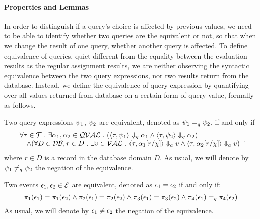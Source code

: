 \paragraph*{Properties and Lemmas}

In order to distinguish if a query's choice is affected by previous values, 
we need to be able to identify whether two queries are the equivalent or not, so that when we change the result of one query, 
whether another query is affected. 
To define equivalence of queries,
quiet different from the equality between the evaluation results as the regular assignment results, 
we are neither observing the syntactic equivalence between the two query expressions,
nor two results return from the database. 
Instead, we define the equivalence of query expression by quantifying over all values returned from database on a certain form of query value, formally as follows.

\begin{defn}
%
\label{def:query_equal}
Two query expressions $\psi_1$, $\psi_2$ are equivalent, denoted as $\psi_1 =_{q} \psi_2$, if and only if
$$
 \begin{array}{l} 
   \forall \mathtt{\tau} \in \mathcal{T} ~.~ \exists \alpha_1, \alpha_2 \in \mathcal{QVAL} ~.~
    (\langle \mathtt{\tau},  \psi_1 \rangle \Downarrow_q \alpha_1 \land \langle \mathtt{\tau},  \psi_2  \rangle \Downarrow_q \alpha_2) 
    \\
    \quad \land (\forall D \in \mathcal{DB}, r \in D ~.~ 
    \exists v \in \mathcal{VAL} ~.~ 
          \langle \mathtt{\tau}, \alpha_1[r/\chi] \rangle \Downarrow_a v \land \langle \mathtt{\tau},  \alpha_2[r/\chi]  \rangle \Downarrow_a v)  
  \end{array}.
$$
 where $r \in D$ is a record in the database domain $D$. 
 As usual, we will denote by $\psi_1 \neq_{q} \psi_2$  the negation of the equivalence.
\end{defn}
%
\begin{defn}
  Two events $\mathtt{\epsilon}_1, \mathtt{\epsilon}_2 \in \mathcal{E}$ are equivalent, 
  denoted as $\mathtt{\epsilon}_1 = \mathtt{\epsilon}_2$ 
  if and only if:
  \[
  \pi_1(\mathtt{\epsilon}_1) = \pi_1(\mathtt{\epsilon}_2) 
  \land  
  \pi_2(\mathtt{\epsilon}_1) = \pi_2(\mathtt{\epsilon}_2) 
  \land
  \pi_{3}(\mathtt{\epsilon}_1) = \pi_{3}(\mathtt{\epsilon}_2)
  \land 
  \pi_{4}(\mathtt{\epsilon}_1) =_q \pi_{4}(\mathtt{\epsilon}_2)
  \]
  As usual, we will denote by $\mathtt{\epsilon}_1 \neq \mathtt{\epsilon}_2$  the negation of the equivalence.
\end{defn}

